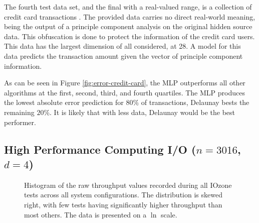 \documentclass[smallextended,final]{svjour3}  %
\begin{document}
The fourth test data set, and the final with a real-valued range, is a
collection of credit card transactions
\cite{pozzolo2015calibrating}. The provided data carries no direct
real-world meaning, being the output of a principle component analysis
on the original hidden source data. This obfuscation is done to
protect the information of the credit card users. This data has the
largest dimension of all considered, at 28. A model for this data
predicts the transaction amount given the vector of principle
component information.

As can be seen in Figure \ref{fig:error-credit-card}, the MLP
outperforms all other algorithms at the first, second, third, and
fourth quartiles. The MLP produces the lowest absolute error
prediction for $80\%$ of transactions, Delaunay bests the remaining
$20\%$. It is likely that with less data, Delaunay would be the best
performer.


\subsection{High Performance Computing I/O ($n = 3016$, $d = 4$)}

\begin{figure}
  \centering
  \caption{Histogram of the raw throughput values recorded during all
    IOzone tests across all system configurations. The distribution is
    skewed right, with few tests having significantly higher
    throughput than most others. The data is presented on a $\ln$
    scale.}
  \label{fig:hist-throughput}
\end{figure}
\end{document}
